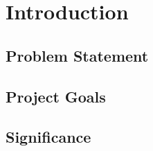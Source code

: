 
\section{Introduction}

\subsection{Problem Statement}

\subsection{Project Goals}

\subsection{Significance}
